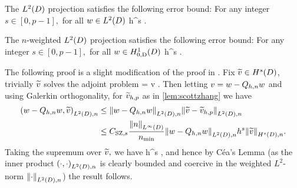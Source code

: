 




The $\LtD$ projection satisfies the following error bound:
\label{lem:ltdprojerr}
For any integer $s \in [0,p-1],$ for all $w \in \LtD$
\beqs
{} \leq \Cmsz h^{s} .
\eeqs
\ele

The $n$-weighted $\LtD$ projection satisfies the following error bound:
\label{lem:wltdprojerr}
For any integer $s \in [0,p-1],$ for all $w \in \HozDD$
\beq\label{eq:wltdprojerr}
 \leq {}  h^{s} .
\eeq
\ele

The following proof is a slight modification of the proof in \cite[Theorem 5.8.3]{BrSc:08}. Fix $\vtilde \in \HsD$, trivially $\widetilde{v}$ solves the adjoint problem
\beqs
{} =  \tforall v \in \LtD.
\eeqs
Then letting $v=w-Q_{h,n} w$ and using Galerkin orthogonality, for $\widetilde{v}_{h,p}$ as in \cref{lem:scottzhang} we have
\begin{align*}
\IPLtDn{w-\Qhn w}{\vtilde} &\leq \NLtDn{w-\Qhn w}\NLtDn{\vtilde-\vhptilde}\\
&\leq \CSZfn{s} \frac{\NLiD{n}}{\nmin}\NLtDn{w-\Qhn w} h^s \NHsDn{\vtilde}.
\end{align*}
Taking the supremum over $\widetilde{v},$ we have
\beqs
{} \leq {}  h^s ,
\eeqs
and hence by C\'ea's Lemma (as the inner product $\IPLtDn{\cdot}{\cdot}$ is clearly bounded and coercive in the weighted $L^2$-norm $\NLtDn{\cdot}$) the result follows.
\epf

